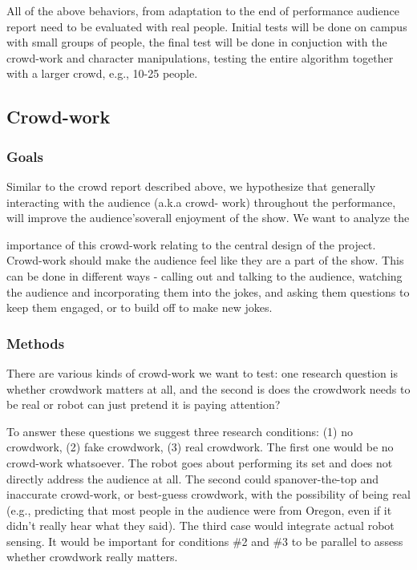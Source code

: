 \documentclass[onecolumn, draftclsnofoot,10pt, compsoc]{IEEEtran}
\begin{document}
All of the above behaviors, from adaptation to the end of performance audience report need to be evaluated with
real people. Initial tests will be done on campus with small groups of people, the final test will be done in conjuction
with the crowd-work and character manipulations, testing the entire algorithm together with a larger crowd, e.g., 10-25
people.


\subsection{Crowd-work}
\subsubsection{Goals}

Similar to the crowd report described above, we hypothesize that generally interacting with the audience (a.k.a crowd-
work) throughout the performance, will improve the audience’soverall enjoyment of the show. We want to analyze the

importance of this crowd-work relating to the central design of the project. Crowd-work should make the audience feel
like they are a part of the show. This can be done in different ways - calling out and talking to the audience, watching
the audience and incorporating them into the jokes, and asking them questions to keep them engaged, or to build off to
make new jokes.

\subsubsection{Methods}
There are various kinds of crowd-work we want to test: one research question is whether crowdwork matters at all, and
the second is does the crowdwork needs to be real or robot can just pretend it is paying attention?

To answer these questions we suggest three research conditions: (1) no crowdwork, (2) fake crowdwork, (3) real
crowdwork. The first one would be no crowd-work whatsoever. The robot goes about performing its set and does
not directly address the audience at all. The second could spanover-the-top and inaccurate crowd-work, or best-guess
crowdwork, with the possibility of being real (e.g., predicting that most people in the audience were from Oregon, even
if it didn’t really hear what they said). The third case would integrate actual robot sensing. It would be important for
conditions \#2 and \#3 to be parallel to assess whether crowdwork really matters.
\end{document}
